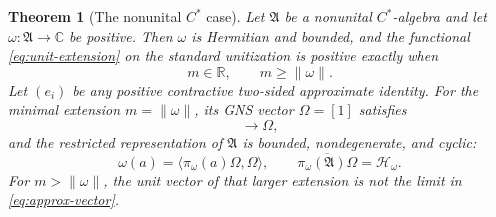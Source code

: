 \documentclass[11pt]{article}
\newtheorem{theorem}{Theorem}[section]
\theoremstyle{definition}
\theoremstyle{remark}
\numberwithin{equation}{section}
\newcommand{\R}{\mathbb R}
\newcommand{\C}{\mathbb C}
\begin{document}
\begin{theorem}[The nonunital $C^*$ case]
Let $\mathfrak A$ be a nonunital $C^*$-algebra and let
$\omega:\mathfrak A\to\C$ be positive.  Then $\omega$ is Hermitian and
bounded, and the functional \eqref{eq:unit-extension} on the standard
unitization is positive exactly when
\begin{equation}
 m\in\R,\qquad m\geq\|\omega\|.
 \label{eq:minimal-mass}
\end{equation}
Let $(e_i)$ be any positive contractive two-sided approximate identity.
For the minimal extension $m=\|\omega\|$, its GNS vector
$\Omega=[1]$ satisfies
\begin{equation}
 [e_i]\longrightarrow\Omega,
 \label{eq:approx-vector}
\end{equation}
and the restricted representation of $\mathfrak A$ is bounded,
nondegenerate, and cyclic:
\begin{equation}
 \omega(a)=\langle\pi_\omega(a)\Omega,\Omega\rangle,
 \qquad
 \overline{\pi_\omega(\mathfrak A)\Omega}=\mathcal H_\omega.
 \label{eq:cyclic-vector}
\end{equation}
For $m>\|\omega\|$, the unit vector of that larger extension is not the
limit in \eqref{eq:approx-vector}.
\end{theorem}
\end{document}
